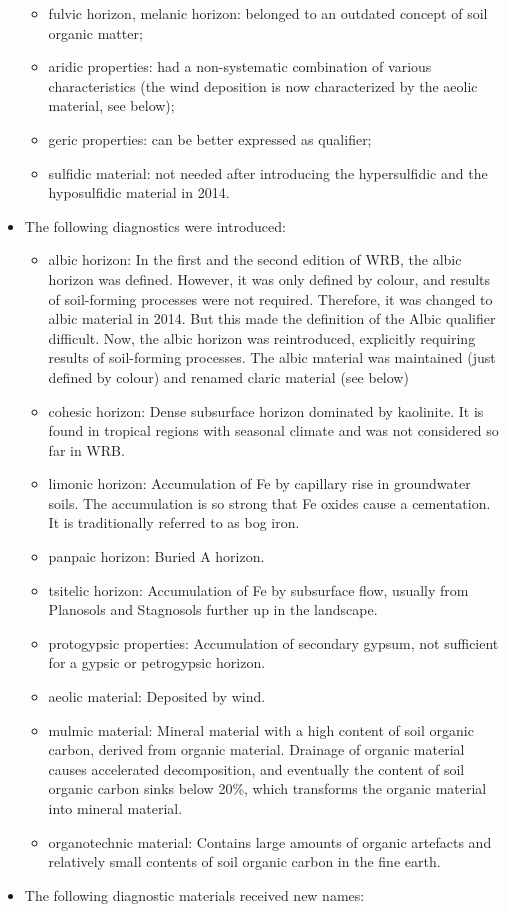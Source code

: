 \documentclass[
  letterpaper,
  DIV=11,
  numbers=noendperiod]{scrreprt}
\providecommand{\tightlist}{%
  \setlength{\itemsep}{0pt}\setlength{\parskip}{0pt}}\usepackage{longtable,booktabs,array}
\begin{document}
\begin{itemize}
  \begin{itemize}
  \tightlist
  \item
    fulvic horizon, melanic horizon: belonged to an outdated concept of
    soil organic matter;
  \item
    aridic properties: had a non-systematic combination of various
    characteristics (the wind deposition is now characterized by the
    aeolic material, see below);
  \item
    geric properties: can be better expressed as qualifier;
  \item
    sulfidic material: not needed after introducing the hypersulfidic
    and the hyposulfidic material in 2014.
  \end{itemize}
\item
  The following diagnostics were introduced:

  \begin{itemize}
  \tightlist
  \item
    albic horizon: In the first and the second edition of WRB, the albic
    horizon was defined. However, it was only defined by colour, and
    results of soil-forming processes were not required. Therefore, it
    was changed to albic material in 2014. But this made the definition
    of the Albic qualifier difficult. Now, the albic horizon was
    reintroduced, explicitly requiring results of soil-forming
    processes. The albic material was maintained (just defined by
    colour) and renamed claric material (see below)
  \item
    cohesic horizon: Dense subsurface horizon dominated by kaolinite. It
    is found in tropical regions with seasonal climate and was not
    considered so far in WRB.
  \item
    limonic horizon: Accumulation of Fe by capillary rise in groundwater
    soils. The accumulation is so strong that Fe oxides cause a
    cementation. It is traditionally referred to as bog iron.
  \item
    panpaic horizon: Buried A horizon.
  \item
    tsitelic horizon: Accumulation of Fe by subsurface flow, usually
    from Planosols and Stagnosols further up in the landscape.
  \item
    protogypsic properties: Accumulation of secondary gypsum, not
    sufficient for a gypsic or petrogypsic horizon.
  \item
    aeolic material: Deposited by wind.
  \item
    mulmic material: Mineral material with a high content of soil
    organic carbon, derived from organic material. Drainage of organic
    material causes accelerated decomposition, and eventually the
    content of soil organic carbon sinks below 20\%, which transforms
    the organic material into mineral material.
  \item
    organotechnic material: Contains large amounts of organic artefacts
    and relatively small contents of soil organic carbon in the fine
    earth.
  \end{itemize}
\item
  The following diagnostic materials received new names:


\end{itemize}
\end{document}
